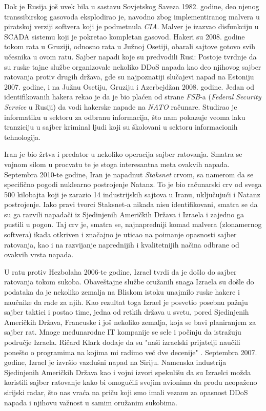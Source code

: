 \documentclass[a4paper]{article}
\begin{document}
{Dok je Rusija još uvek bila u sastavu Sovjetskog Saveza 1982. godine, deo njenog transsibirskog gasovoda eksplodirao je, navodno zbog implementiranog malvera u piratskoj verziji softvera koji je podmetnula \emph{CIA}. Malver je izazvao disfunkciju u SCADA sistemu koji je pokretao kompletan gasovod.
Hakeri su 2008. godine tokom rata u Gruziji, odnosno rata u Južnoj Osetiji, obarali sajtove gotovo svih učesnika u ovom ratu.
Sajber napadi koje su predvodili Rusi:
Postoje tvrdnje da su ruske tajne službe organizovale nekoliko DDoS napada kao deo njihovog sajber ratovanja protiv drugih država, gde su najpoznatiji slučajevi napad na Estoniju 2007. godine, i na Južnu Osetiju, Gruziju i Azerbejdžan 2008. godine. Jedan od identifikovanih hakera rekao je da je bio plaćen od strane \emph{FSB}-a (\emph{Federal Security Service} u Rusiji) da vodi hakerske napade na \emph{NATO} računare. Studirao je informatiku u sektoru za odbranu informacija, što nam pokazuje veoma laku tranziciju u sajber kriminal ljudi koji su školovani u sektoru informacionih tehnologija.

Iran je bio žrtva i predator u nekoliko operacija sajber ratovanja. Smatra se vojnom silom u procvatu te je stoga interesantna meta ovakvih napada.
Septembra 2010-te godine, Iran je napadnut \emph{Staksnet} crvom, sa namerom da se specifično pogodi nuklearno postrojenje Natanz. To je bio računarski crv od svega 500 kilobajta koji je zarazio 14 industrijskih sajtova u Iranu, uključujući i Natanz postrojenje. Iako pravi tvorci Staksnet-a nikada nisu identifikovani, smatra se da su ga razvili napadači iz Sjedinjenih Američkih Država i Izraela i zajedno ga pustili u pogon. Taj crv je, smatra se, najnapredniji komad malvera (zlonamernog softvera) ikada otkriven i značajno je uticao na poimanje opasnosti sajber ratovanja, kao i na razvijanje naprednijih i kvalitetnijih načina odbrane od ovakvih vrsta napada.

U ratu protiv Hezbolaha 2006-te godine, Izrael tvrdi da je došlo do sajber ratovanja tokom sukoba. Obaveštajne službe oružanih snaga Izraela su došle do podataka da je nekoliko zemalja na Bliskom istoku unajmilo ruske hakere i naučnike da rade za njih. Kao rezultat toga Izrael je posvetio posebnu pažnju sajber taktici i postao time, jedna od retkih država u svetu, pored Sjedinjenih Američkih Država, Francuske i još nekoliko zemalja, koja se bavi planiranjem za sajber rat. Mnoge međunarodne IT kompanije se sele i počinju da istražuju područje Izraela. Ričard Klark dodaje da su "naši izraelski prijatelji naučili ponešto o programima na kojima mi radimo već dve decenije" .
Septembra 2007. godine, Izrael je izvršio vazdušni napad na Siriju. Namenska industrija Sjedinjenih Američkih Država kao i vojni izvori spekulišu da su Izraelci možda koristili sajber ratovanje kako bi omogućili svojim avionima da prođu neopaženo sirijski radar, što nas vraća na priču koji smo imali vezanu za opasnost DDoS napada i njihovu važnost u samim oružanim sukobima.

}
\end{document}
